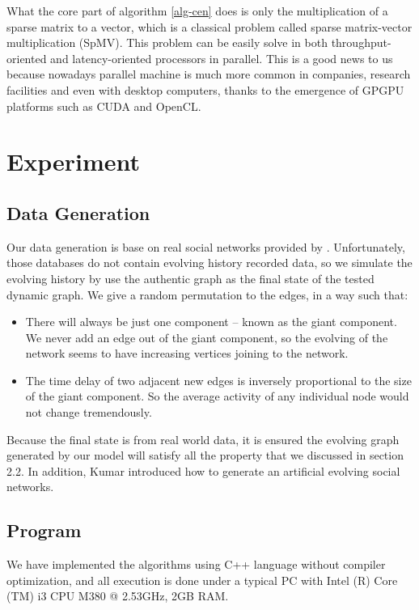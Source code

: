 \documentclass[12pt,abstract=true]{scrartcl}
\numberwithin{equation}{section}
\theoremstyle{definition}   \newtheorem{definition}{Definition}[section]
\theoremstyle{plain}        \newtheorem{theorem}{Theorem}[section]
\theoremstyle{plain}        \newtheorem{observation}{Observation}[section]
\theoremstyle{plain}        \newtheorem{fact}{Fact}[section]
\theoremstyle{plain}        \newtheorem{claim}{Claim}[section]
\theoremstyle{plain}        \newtheorem{lemma}[theorem]{Lemma}
\theoremstyle{plain}        \newtheorem{corollary}[theorem]{Corollary}
\theoremstyle{remark}       \newtheorem{example}{Example}[section]
\theoremstyle{remark}       \newtheorem{remark}{Remark}[section]
\begin{document}
What the core part of algorithm \ref{alg-cen} does is only the multiplication
of a sparse matrix to a vector, which is a classical problem called sparse
matrix-vector multiplication (SpMV). This problem can be easily solve in both
throughput-oriented and latency-oriented processors in
parallel\cite{williams2009optimization, bell2008efficient,
bell2009implementing, catalyurek1999hypergraph, zhuo2005sparse}.  This is a
good news to us because nowadays parallel machine is much more common in
companies, research facilities and even with desktop computers, thanks to the
emergence of GPGPU platforms such as CUDA and OpenCL.

\section{Experiment}
\subsection{Data Generation} 
Our data generation is base on real social networks provided by \cite{database1,
database2}. Unfortunately, those databases do not contain evolving history
recorded data, so we simulate the evolving history by use the
authentic graph as the final state of the tested dynamic graph.
We give a random permutation to the edges, in a way such that:
\begin{itemize}
\item There will always
be just one component -- known as the giant component. We never add an edge out
of the giant component, so the evolving of the network seems to have increasing
vertices joining to the network.
\item The time delay of two adjacent new edges is inversely proportional to the
size of the giant component. So the average activity of any individual node
would not change tremendously.
\end{itemize}
Because the final state
is from real world data, it is ensured 
the evolving graph generated by our model will satisfy all the property that we
discussed in section 2.2. In addition, Kumar introduced how to generate
an artificial evolving social networks\cite{kumar2010structure}.

\subsection{Program}
We have implemented the algorithms using C++ language without compiler
optimization, and all execution is done under a typical PC with 
Intel (R) Core (TM) i3 CPU M380  @ 2.53GHz, 2GB RAM.
	
\end{document}
